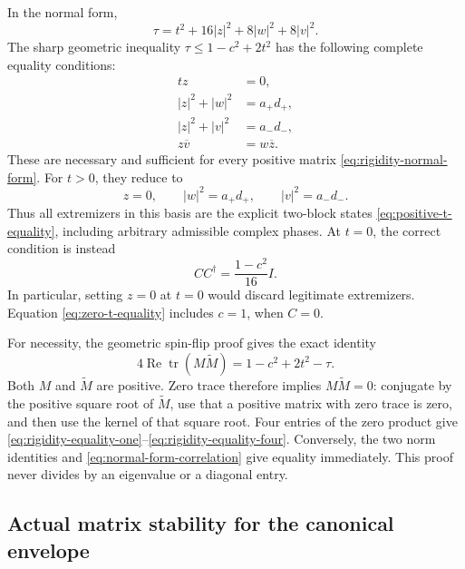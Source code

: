 In the normal form,
\begin{equation}
 \tau=t^2+16|z|^2+8|w|^2+8|v|^2.
 \label{eq:normal-form-correlation}
\end{equation}
The sharp geometric inequality \(\tau\leq1-c^2+2t^2\) has the following
complete equality conditions:
\begin{align}
 t z&=0,\label{eq:rigidity-equality-one}\\
 |z|^2+|w|^2&=a_+d_+,\label{eq:rigidity-equality-two}\\
 |z|^2+|v|^2&=a_-d_-,\label{eq:rigidity-equality-three}\\
 z\overline v&=w\overline z.\label{eq:rigidity-equality-four}
\end{align}
These are necessary and sufficient for every positive matrix
\eqref{eq:rigidity-normal-form}.  For \(t>0\), they reduce to
\begin{equation}
 z=0,\qquad |w|^2=a_+d_+,\qquad |v|^2=a_-d_-.
 \label{eq:positive-t-equality}
\end{equation}
Thus all extremizers in this basis are the explicit two-block states
\eqref{eq:positive-t-equality}, including arbitrary admissible complex
phases.  At \(t=0\), the correct condition is instead
\begin{equation}
 C C^\dagger=\frac{1-c^2}{16}I.
 \label{eq:zero-t-equality}
\end{equation}
In particular, setting \(z=0\) at \(t=0\) would discard legitimate
extremizers.  Equation \eqref{eq:zero-t-equality} includes \(c=1\), when
\(C=0\).

For necessity, the geometric spin-flip proof gives the exact identity
\[
 4\operatorname{Re}\operatorname{tr}(M\widetilde M)
 =1-c^2+2t^2-\tau.
\]
Both \(M\) and \(\widetilde M\) are positive.  Zero trace therefore implies
\(M\widetilde M=0\): conjugate by the positive square root of
\(\widetilde M\), use that a positive matrix with zero trace is zero, and
then use the kernel of that square root.  Four entries of the zero product
give \eqref{eq:rigidity-equality-one}--\eqref{eq:rigidity-equality-four}.
Conversely, the two norm identities and
\eqref{eq:normal-form-correlation} give equality immediately.  This proof
never divides by an eigenvalue or a diagonal entry.

\subsection{Actual matrix stability for the canonical envelope}


